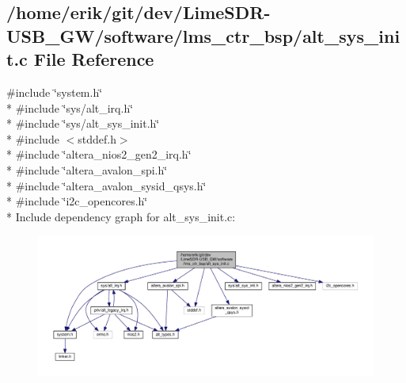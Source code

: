 \subsection{/home/erik/git/dev/\+Lime\+S\+D\+R-\/\+U\+S\+B\+\_\+\+G\+W/software/lms\+\_\+ctr\+\_\+bsp/alt\+\_\+sys\+\_\+init.c File Reference}
\label{alt__sys__init_8c}
{\ttfamily \#include \char`\"{}system.\+h\char`\"{}}\\*
{\ttfamily \#include \char`\"{}sys/alt\+\_\+irq.\+h\char`\"{}}\\*
{\ttfamily \#include \char`\"{}sys/alt\+\_\+sys\+\_\+init.\+h\char`\"{}}\\*
{\ttfamily \#include $<$stddef.\+h$>$}\\*
{\ttfamily \#include \char`\"{}altera\+\_\+nios2\+\_\+gen2\+\_\+irq.\+h\char`\"{}}\\*
{\ttfamily \#include \char`\"{}altera\+\_\+avalon\+\_\+spi.\+h\char`\"{}}\\*
{\ttfamily \#include \char`\"{}altera\+\_\+avalon\+\_\+sysid\+\_\+qsys.\+h\char`\"{}}\\*
{\ttfamily \#include \char`\"{}i2c\+\_\+opencores.\+h\char`\"{}}\\*
Include dependency graph for alt\+\_\+sys\+\_\+init.\+c\+:
\nopagebreak
\begin{figure}[H]
\begin{center}
\leavevmode
\includegraphics[width=350pt]{dd/da5/alt__sys__init_8c__incl}
\end{center}
\end{figure}
